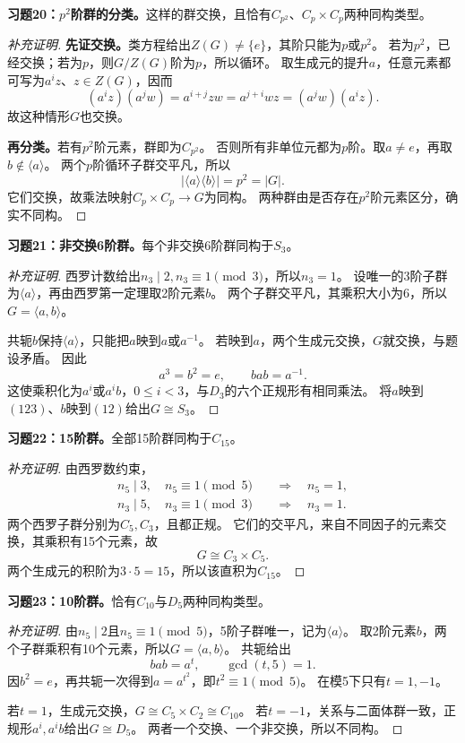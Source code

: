 \begin{problem}
\textbf{习题20：$p^2$阶群的分类。}这样的群交换，且恰有$C_{p^2}$、$C_p\times C_p$两种同构类型。
\end{problem}
\begin{proof}[补充证明]
\textbf{先证交换。}类方程给出$Z(G)\neq\{e\}$，其阶只能为$p$或$p^2$。
若为$p^2$，已经交换；若为$p$，则$G/Z(G)$阶为$p$，所以循环。
取生成元的提升$a$，任意元素都可写为$a^iz$、$z\in Z(G)$，因而
\[
(a^iz)(a^jw)=a^{i+j}zw=a^{j+i}wz=(a^jw)(a^iz).
\]
故这种情形$G$也交换。

\textbf{再分类。}若有$p^2$阶元素，群即为$C_{p^2}$。
否则所有非单位元都为$p$阶。取$a\neq e$，再取$b\notin\langle a\rangle$。
两个$p$阶循环子群交平凡，所以
\[
|\langle a\rangle\langle b\rangle|=p^2=|G|.
\]
它们交换，故乘法映射$C_p\times C_p\to G$为同构。
两种群由是否存在$p^2$阶元素区分，确实不同构。
\end{proof}

\begin{problem}
\textbf{习题21：非交换6阶群。}每个非交换6阶群同构于$S_3$。
\end{problem}
\begin{proof}[补充证明]
西罗计数给出$n_3\mid2,n_3\equiv1\pmod3$，所以$n_3=1$。
设唯一的3阶子群为$\langle a\rangle$，再由西罗第一定理取2阶元素$b$。
两个子群交平凡，其乘积大小为6，所以$G=\langle a,b\rangle$。

共轭$b$保持$\langle a\rangle$，只能把$a$映到$a$或$a^{-1}$。
若映到$a$，两个生成元交换，$G$就交换，与题设矛盾。
因此
\[
a^3=b^2=e,\qquad bab=a^{-1}.
\]
这使乘积化为$a^i$或$a^ib$，$0\leq i<3$，与$D_3$的六个正规形有相同乘法。
将$a$映到$(123)$、$b$映到$(12)$给出$G\cong S_3$。
\end{proof}

\begin{problem}
\textbf{习题22：15阶群。}全部15阶群同构于$C_{15}$。
\end{problem}
\begin{proof}[补充证明]
由西罗数约束，
\begin{align*}
n_5\mid3,\quad n_5\equiv1\pmod5&\quad\Longrightarrow\quad n_5=1,\\
n_3\mid5,\quad n_3\equiv1\pmod3&\quad\Longrightarrow\quad n_3=1.
\end{align*}
两个西罗子群分别为$C_5,C_3$，且都正规。
它们的交平凡，来自不同因子的元素交换，其乘积有15个元素，故
\[
G\cong C_3\times C_5.
\]
两个生成元的积阶为$3\cdot5=15$，所以该直积为$C_{15}$。
\end{proof}

\begin{problem}
\textbf{习题23：10阶群。}恰有$C_{10}$与$D_5$两种同构类型。
\end{problem}
\begin{proof}[补充证明]
由$n_5\mid2$且$n_5\equiv1\pmod5$，5阶子群唯一，记为$\langle a\rangle$。
取2阶元素$b$，两个子群乘积有10个元素，所以$G=\langle a,b\rangle$。
共轭给出
\[
bab=a^t,\qquad\gcd(t,5)=1.
\]
因$b^2=e$，再共轭一次得到$a=a^{t^2}$，即$t^2\equiv1\pmod5$。
在模5下只有$t=1,-1$。

若$t=1$，生成元交换，$G\cong C_5\times C_2\cong C_{10}$。
若$t=-1$，关系与二面体群一致，正规形$a^i,a^ib$给出$G\cong D_5$。
两者一个交换、一个非交换，所以不同构。
\end{proof}

